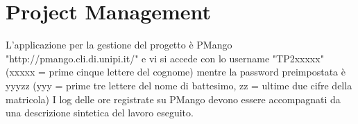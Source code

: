 \section{Project Management}
L'applicazione per la gestione del progetto è PMango "http://pmango.cli.di.unipi.it/" e vi si accede con lo username "TP2xxxxx" (xxxxx = prime cinque lettere del cognome) mentre la password preimpostata è yyyzz (yyy = prime tre lettere del nome di battesimo, zz = ultime due cifre della matricola)
I log delle ore registrate su PMango devono essere accompagnati da una descrizione sintetica del lavoro eseguito.
